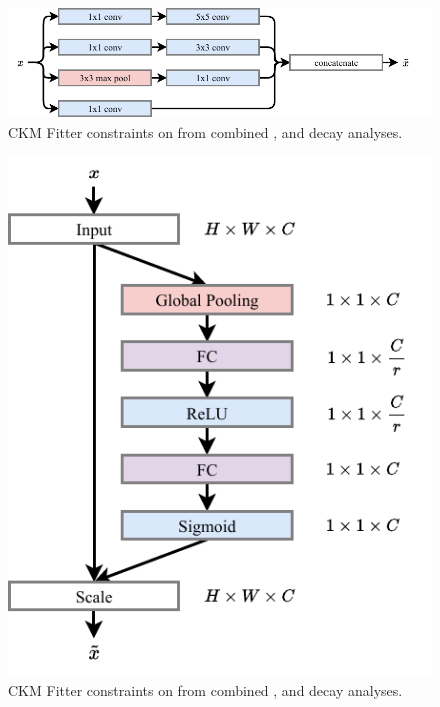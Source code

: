 \begin{figure}
    \includegraphics[width=\textwidth]{diagrams/6-cvn/inception.pdf}
    \caption[CKM Fitter constraints on \alphaCKM.]%
    {CKM Fitter constraints on \alphaCKM from combined \BToPiPi,
        \BToRhoPi and \BToRhoRho decay analyses.}
    \label{fig:inception}
\end{figure}

\begin{figure}
    \includegraphics[width=\largefigwidth]{diagrams/6-cvn/se.pdf}
    \caption[CKM Fitter constraints on \alphaCKM.]%
    {CKM Fitter constraints on \alphaCKM from combined \BToPiPi,
        \BToRhoPi and \BToRhoRho decay analyses.}
    \label{fig:se}
\end{figure}

